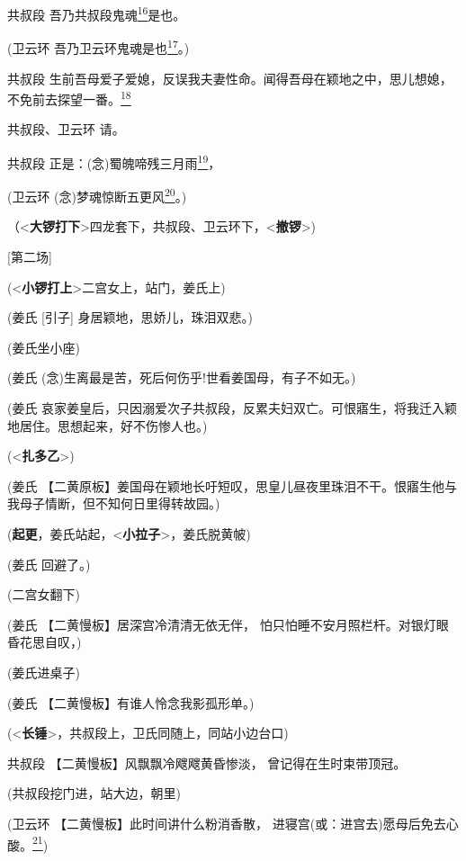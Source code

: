 共叔段
吾乃共叔段鬼魂\protect\hyperlink{fn16}{\textsuperscript{16}}是也。

(卫云环
吾乃卫云环鬼魂是也\protect\hyperlink{fn17}{\textsuperscript{17}}。)

共叔段
生前吾母爱子爱媳，反误我夫妻性命。闻得吾母在颖地之中，思儿想媳，不免前去探望一番。\protect\hyperlink{fn18}{\textsuperscript{18}}

共叔段、卫云环 请。

共叔段
正是：(念)蜀魄啼残三月雨\protect\hyperlink{fn19}{\textsuperscript{19}}，

(卫云环
(念)梦魂惊断五更风\protect\hyperlink{fn20}{\textsuperscript{20}}。)

（\textless{}\textbf{大锣打下}\textgreater{}四龙套下，共叔段、卫云环下，\textless{}\textbf{撤锣}\textgreater{})

{[}第二场{]}

(\textless{}\textbf{小锣打上}\textgreater{}二宫女上，站门，姜氏上)

(姜氏 {[}引子{]} 身居颖地，思娇儿，珠泪双悲。)

(姜氏坐小座)

(姜氏 (念)生离最是苦，死后何伤乎!世看姜国母，有子不如无。)

(姜氏
哀家姜皇后，只因溺爱次子共叔段，反累夫妇双亡。可恨寤生，将我迁入颖地居住。思想起来，好不伤惨人也。)

(\textless{}\textbf{扎多乙}\textgreater{})

(姜氏
【二黄原板】姜国母在颖地长吁短叹，思皇儿昼夜里珠泪不干。恨寤生他与我母子情断，但不知何日里得转故园。)

(\textbf{起更}，姜氏站起，\textless{}\textbf{小拉子}\textgreater{}，姜氏脱黄帔)

(姜氏 回避了。)

(二宫女翻下)

(姜氏 【二黄慢板】居深宫冷清清无依无伴，
怕只怕睡不安月照栏杆。对银灯眼昏花思自叹，)

(姜氏进桌子)

(姜氏 【二黄慢板】有谁人怜念我影孤形单。)

(\textless{}\textbf{长锤}\textgreater{}，共叔段上，卫氏同随上，同站小边台口)

共叔段 【二黄慢板】风飘飘冷飕飕黄昏惨淡， 曾记得在生时束带顶冠。

(共叔段挖门进，站大边，朝里)

(卫云环 【二黄慢板】此时间讲什么粉消香散，
进寝宫(或：进宫去)愿母后免去心酸。\protect\hyperlink{fn21}{\textsuperscript{21}})

